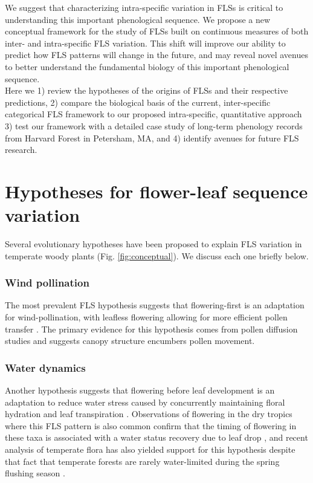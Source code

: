 \documentclass[11pt]{article}
\begin{document}
We suggest that characterizing intra-specific variation in FLSs is critical to understanding this important phenological sequence. We propose a new conceptual framework for the study of FLSs built on continuous measures of both inter- and intra-specific FLS variation. This shift will improve our ability to predict how FLS patterns will change in the future, and  may reveal novel avenues to better understand the fundamental biology of this important phenological sequence.\\


\noindent Here we 1) review the hypotheses of the origins of FLSs and their respective predictions, 2) compare the biological basis of the current, inter-specific categorical FLS framework to our proposed intra-specific, quantitative approach 3) test our framework with a detailed case study of long-term phenology records from Harvard Forest in Petersham, MA, and 4) identify avenues for future FLS research.

\section*{Hypotheses for flower-leaf sequence variation}
\noident Several evolutionary hypotheses have been proposed to explain FLS variation in temperate woody plants (Fig. \ref{fig:conceptual}). We discuss each one briefly below.
\subsubsection*{ Wind pollination}
\noindent The most prevalent FLS hypothesis suggests that flowering-first is an adaptation for wind-pollination, with leafless flowering allowing for more efficient pollen transfer \citep{Whitehead1969}. The primary evidence for this hypothesis comes from pollen diffusion studies \citep[e.g., particle movement through closed and open canopies,][]{Niklas1985, Milleron2012} and suggests canopy structure encumbers pollen movement. %
\subsubsection*{Water dynamics}
\noindent Another hypothesis suggests that flowering before leaf development is an adaptation to reduce water stress caused by concurrently maintaining floral hydration and leaf transpiration \citep{Franklin2016}. Observations of flowering in the dry tropics where this FLS pattern is also common confirm that the timing of flowering in these taxa is associated with a water status recovery due to leaf drop \citep{Borchert1983,Reich1984}, and recent analysis of temperate flora has also yielded support for this hypothesis despite that fact that temperate forests are rarely water-limited during the spring flushing season \citep{Gougherty2018}. %
\end{document}
